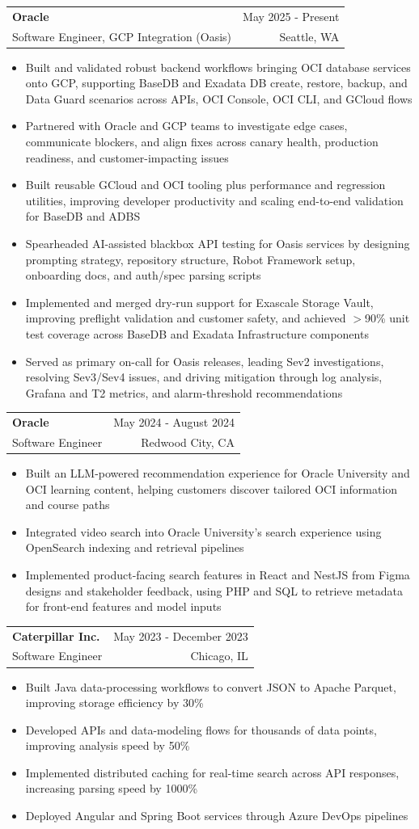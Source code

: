 \documentclass[letterpaper,11pt]{article}
\makeatletter
\newcommand{\resumeItem}[1]{
  \item\small{
    {#1 \vspace{-2pt}}
  }
}
\newcommand{\resumeSubheading}[4]{
  \vspace{-2pt}\item
    \begin{tabular*}{0.97\textwidth}[t]{l@{\extracolsep{\fill}}r}
      \textbf{#1} & #2 \\
      {\small#3} & {\small #4} \\
    \end{tabular*}\vspace{-7pt}
}
\newcommand{\resumeItemListStart}{\begin{itemize}}
\newcommand{\resumeItemListEnd}{\end{itemize}\vspace{-5pt}}
\makeatother
\begin{document}
    \resumeSubheading
  {Oracle}{May 2025 - Present}
  {Software Engineer, GCP Integration (Oasis)}{Seattle, WA}
  \resumeItemListStart
    \resumeItem{Built and validated robust backend workflows bringing OCI database services onto GCP, supporting BaseDB and Exadata DB create, restore, backup, and Data Guard scenarios across APIs, OCI Console, OCI CLI, and GCloud flows}
    \resumeItem{Partnered with Oracle and GCP teams to investigate edge cases, communicate blockers, and align fixes across canary health, production readiness, and customer-impacting issues}
    \resumeItem{Built reusable GCloud and OCI tooling plus performance and regression utilities, improving developer productivity and scaling end-to-end validation for BaseDB and ADBS}
    \resumeItem{Spearheaded AI-assisted blackbox API testing for Oasis services by designing prompting strategy, repository structure, Robot Framework setup, onboarding docs, and auth/spec parsing scripts}
    \resumeItem{Implemented and merged dry-run support for Exascale Storage Vault, improving preflight validation and customer safety, and achieved $>$90\% unit test coverage across BaseDB and Exadata Infrastructure components}
    \resumeItem{Served as primary on-call for Oasis releases, leading Sev2 investigations, resolving Sev3/Sev4 issues, and driving mitigation through log analysis, Grafana and T2 metrics, and alarm-threshold recommendations}
  \resumeItemListEnd

    \resumeSubheading
      {Oracle}{May 2024 - August 2024}
      {Software Engineer}{Redwood City, CA}
      \resumeItemListStart
        \resumeItem{Built an LLM-powered recommendation experience for Oracle University and OCI learning content, helping customers discover tailored OCI information and course paths}
        \resumeItem{Integrated video search into Oracle University's search experience using OpenSearch indexing and retrieval pipelines}
        \resumeItem{Implemented product-facing search features in React and NestJS from Figma designs and stakeholder feedback, using PHP and SQL to retrieve metadata for front-end features and model inputs}
      \resumeItemListEnd

    \resumeSubheading
      {Caterpillar Inc.}{May 2023 - December 2023}
      {Software Engineer}{Chicago, IL}
      \resumeItemListStart
        \resumeItem{Built Java data-processing workflows to convert JSON to Apache Parquet, improving storage efficiency by 30\%}
        \resumeItem{Developed APIs and data-modeling flows for thousands of data points, improving analysis speed by 50\%}
        \resumeItem{Implemented distributed caching for real-time search across API responses, increasing parsing speed by 1000\%}
        \resumeItem{Deployed Angular and Spring Boot services through Azure DevOps pipelines}
      \resumeItemListEnd
\end{document}
